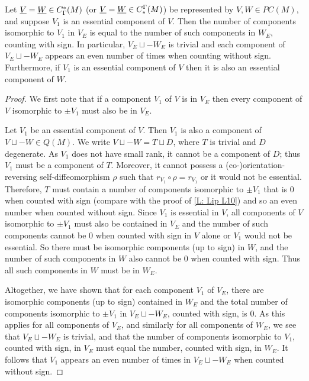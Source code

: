 \begin{lemma}\label{L: essential}
	Let $\underline{V} = \underline{W} \in C^*_\Gamma(M)$ (or $\underline{V} = \underline{W} \in C_*^\Gamma(M)$) be represented by $V,W \in PC(M)$, and suppose $V_1$ is an essential component of $V$.
	Then the number of components isomorphic to ${V_1}$ in $V_E$ is equal to the number of such components
	in $W_E$, counting with sign.
	In particular, $V_E \sqcup -W_E$ is trivial
	and each component of $V_E \sqcup -W_E$ appears an even number of times when counting without sign.
	Furthermore, if ${V_1}$ is an essential component of $V$ then it is also an essential component of $W$.
\end{lemma}

\begin{proof}
	We first note that if a component $V_1$ of $V$ is in $V_E$ then every component of $V$ isomorphic to $\pm V_1$ must also be in $V_E$.

	Let $V_1$ be an essential component of $V$.
	Then $V_1$ is also a component of $V \sqcup -W \in Q(M)$.
	We write $V \sqcup -W = T \sqcup D$, where $T$ is trivial and $D$ degenerate.
	As $V_1$ does not have small rank, it cannot be a component of $D$; thus $V_1$ must be a component of $T$.
	Moreover, it cannot possess a (co-)orientation-reversing self-diffeomorphism $\rho$ such that $r_{V_1} \circ \rho = r_{V_1}$ or it would not be essential.
	Therefore, $T$
	must contain a number of components isomorphic to $\pm V_1$ that is $0$ when counted with sign (compare with the proof of \cref{L: Lip L10})
	and so an even number when counted without sign.
	Since $V_1$ is essential in $V$, all components of $V$ isomorphic to $\pm V_1$ must also be contained in $V_E$ and
	the number of such components cannot be $0$ when counted with sign in $V$ alone or $V_1$ would not be essential.
	So there must be isomorphic components (up to sign) in $W$, and the number of such components in $W$ also cannot be $0$ when counted
	with sign.
	Thus all such components in $W$ must be in $W_E$.

	Altogether, we have shown that for each component $V_1$ of $V_E$, there are isomorphic components (up to sign) contained in $W_E$
	and the total number of components isomorphic to $\pm V_1$ in $V_E\sqcup-W_E$, counted with sign, is $0$.
	As this applies for all components of $V_E$, and similarly for all components of $W_E$, we see that $V_E \sqcup -W_E$ is trivial, and that the number of
	components isomorphic to $V_1$, counted with sign, in $V_E$ must equal the number, counted with sign, in $W_E$.
	It follows that $V_1$ appears an
	even number of times in $V_E\sqcup-W_E$ when counted without sign.
\end{proof}

